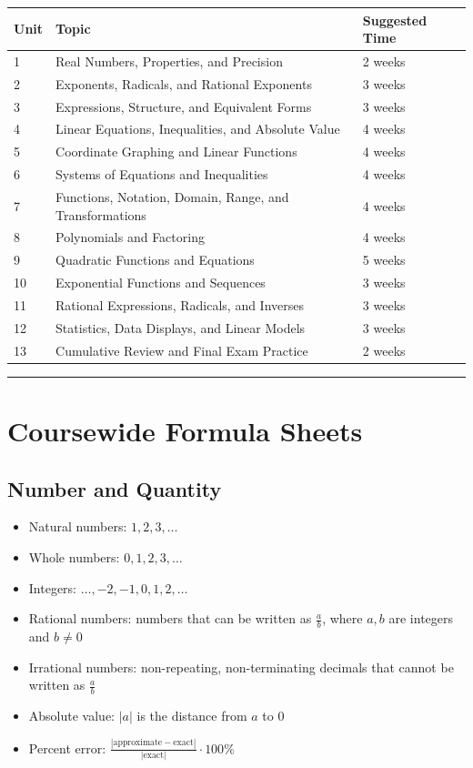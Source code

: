 \documentclass[11pt]{book}
\begin{document}
\begin{longtable}{|p{}|p{}|p{}|}
\hline
Unit & Topic & Suggested Time \\ \hline
1 & Real Numbers, Properties, and Precision & 2 weeks \\ \hline
2 & Exponents, Radicals, and Rational Exponents & 3 weeks \\ \hline
3 & Expressions, Structure, and Equivalent Forms & 3 weeks \\ \hline
4 & Linear Equations, Inequalities, and Absolute Value & 4 weeks \\ \hline
5 & Coordinate Graphing and Linear Functions & 4 weeks \\ \hline
6 & Systems of Equations and Inequalities & 4 weeks \\ \hline
7 & Functions, Notation, Domain, Range, and Transformations & 4 weeks \\ \hline
8 & Polynomials and Factoring & 4 weeks \\ \hline
9 & Quadratic Functions and Equations & 5 weeks \\ \hline
10 & Exponential Functions and Sequences & 3 weeks \\ \hline
11 & Rational Expressions, Radicals, and Inverses & 3 weeks \\ \hline
12 & Statistics, Data Displays, and Linear Models & 3 weeks \\ \hline
13 & Cumulative Review and Final Exam Practice & 2 weeks \\ \hline
\end{longtable}

\bigskip\hrule\bigskip

\chapter{Coursewide Formula Sheets}

\section{Number and Quantity}

\begin{itemize}
\item Natural numbers: \(1,2,3,\ldots\)
\item Whole numbers: \(0,1,2,3,\ldots\)
\item Integers: \(\ldots,-2,-1,0,1,2,\ldots\)
\item Rational numbers: numbers that can be written as \(\frac{a}{b}\), where \(a,b\) are integers and \(b\ne0\)
\item Irrational numbers: non-repeating, non-terminating decimals that cannot be written as \(\frac{a}{b}\)
\item Absolute value: \(|a|\) is the distance from \(a\) to 0
\item Percent error: \(\frac{|\text{approximate}-\text{exact}|}{|\text{exact}|}\cdot100\%\)
\end{itemize}
\end{document}
